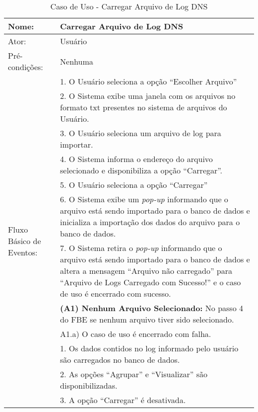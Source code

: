 \begin{table}[]
\centering
\caption{Caso de Uso - Carregar Arquivo de Log DNS}
\label{tab:use_case_load_file}
\begin{tabular}{|lp{10cm}|}
\hline
Nome: & Carregar Arquivo de Log DNS  \\ \hline
Ator: & Usuário   \\ \hline
Pré-condições: & Nenhuma   \\ \hline
\multirow{15}{*}{Fluxo Básico de Eventos:} & 1. O Usuário seleciona a opção ``Escolher Arquivo''  \\
 & 2. O Sistema exibe uma janela com os arquivos no formato txt presentes no sistema de arquivos do Usuário.  \\
 & 3. O Usuário seleciona um arquivo de log para importar.  \\
 & 4. O Sistema informa o endereço do arquivo selecionado e disponibiliza a opção ``Carregar''. \\
 & 5. O Usuário seleciona a opção ``Carregar'' \\
 & 6. O Sistema exibe um \textit{pop-up} informando que o arquivo está sendo importado para o banco de dados e inicializa a importação dos dados do arquivo para o banco de dados. \\
 & 7. O Sistema retira o \textit{pop-up} informando que o arquivo está sendo importado para o banco de dados e altera a mensagem ``Arquivo não carregado'' para ``Arquivo de Logs Carregado com Sucesso!'' e o caso de uso é encerrado com sucesso.\\ \hline
\multirow{3}{*}{Fluxo Alternativo de Eventos:} & \textbf{(A1) Nenhum Arquivo Selecionado:} No passo 4 do FBE se nenhum arquivo tiver sido selecionado.\\
 & A1.a) O caso de uso é encerrado com falha.\\ \hline
\multirow{4}{*}{Pós-Condições:} & 1. Os dados contidos no log informado pelo usuário são carregados no banco de dados. \\
 & 2. As opções ``Agrupar'' e ``Visualizar'' são disponibilizadas.\\
 & 3. A opção ``Carregar'' é desativada.\\
\hline 
\end{tabular}
\end{table}

